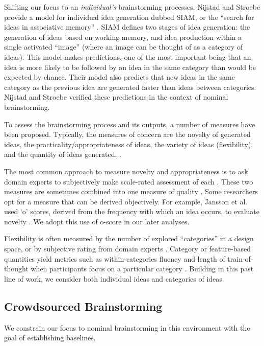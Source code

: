 Shifting our focus to an \emph{individual's} brainstorming processes, Nijstad and Stroebe provide a model for individual idea generation dubbed SIAM, or the ``search for ideas in associative memory'' \cite{nijstad_how_2006}. SIAM defines two stages of idea generation: the generation of ideas based on working memory, and idea production within a single activated ``image'' (where an image can be thought of as a category of ideas). This model makes predictions, one of the most important being that an idea is more likely to be followed by an idea in the same category than would be expected by chance. Their model also predicts that new ideas in the same category as the previous idea are generated faster than ideas between categories. Nijstad and Stroebe verified these predictions in the context of nominal brainstorming.

To assess the brainstorming process and its outputs, a number of measures have been proposed. Typically, the measures of concern are the novelty of generated ideas, the practicality/appropriateness of ideas, the variety of ideas (flexibility), and the quantity of ideas generated. \cite{finke1992creative, shah2003metrics}.

The most common approach to measure novelty and appropriateness is to ask domain experts to subjectively make scale-rated assessment of each \cite{lewis2011affective, amabile_1983}. These two measures are sometimes combined into one measure of quality \cite{little2010exploring}.
Some researchers opt for a measure that can be derived objectively. For example, Jansson et al. used `o' scores, derived from the frequency with which an idea occurs, to evaluate novelty \cite{jansson_design_1991}. We adopt this use of o-score in our later analyses.

Flexibility is often measured by the number of explored ``categories'' in a design space, or by subjective rating from domain experts \cite{lewis2011affective, marsh1996examples}. Category or feature-based quantities yield metrics such as within-categories fluency and length of train-of-thought when participants focus on a particular category \cite{nijstad_how_2006}. Building in this past line of work, we consider both individual ideas and categories of ideas.

\subsection{Crowdsourced Brainstorming}
We constrain our focus to nominal brainstorming in this environment with the goal of establishing baselines.

